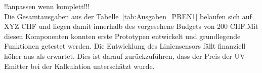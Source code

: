 \documentclass[main.tex]{subfiles} %
\begin{document}
!!anpassen wenn komplett!!!\\
Die Gesamtausgaben aus der Tabelle~\ref{tab:Ausgaben_PREN1} belaufen sich auf XYZ CHF und liegen
damit innerhalb des vorgesehene Budgets von 200 CHF.Mit diesen Komponenten 
konnten erste Prototypen entwickelt und grundlegende Funktionen getestet werden. Die Entwicklung 
des Liniensensors fällt finanziell höher aus als erwartet. Dies ist darauf zurückzuführen, dass der
Preis der UV-Emitter bei der Kalkulation unterschätzt wurde.
\end{document}
